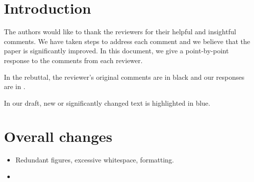 \documentclass{vldb}
\newcommand{\resp}[1]{{\color{blue}{#1}}}
\begin{document}
\section{Introduction}
The authors would like to thank the reviewers for their helpful and insightful comments.
We have taken steps to address each comment and we believe that the paper is significantly improved.
In this document, we give a point-by-point response to the comments from each reviewer.

In the rebuttal, the reviewer's original comments are in black and our responses are in \resp{blue}.

In our draft, new or significantly changed text is highlighted in {\color{blue}blue}.

\section{Overall changes}
\begin{itemize}
\item Redundant figures, excessive whitespace, formatting.
  
  \resp{Several reviewers commented on the amount of whitespace, so we've compressed many of the figures and removed whitespace to make room for additional material.}
  
\item \resp{
    We have improved our system since the paper was submitted by adding imputation for categorical variables.
    This has a minor impact on the experimental results.
    It improves the ability of the regression tree model to perform imputation by making these variables available to the model.
  }
\end{itemize}
\end{document}
